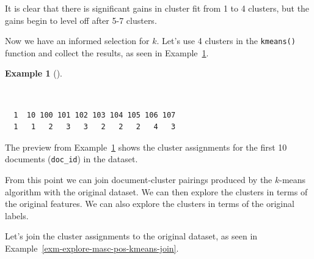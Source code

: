 \documentclass[
  letterpaper,
]{book}
\newenvironment{Shaded}{\begin{snugshade}}{\end{snugshade}}
\newcommand{\AttributeTok}[1]{\textcolor[rgb]{0.00,0.00,0.00}{#1}}
\newcommand{\CommentTok}[1]{\textcolor[rgb]{0.00,0.00,0.00}{\textit{#1}}}
\newcommand{\DecValTok}[1]{\textcolor[rgb]{0.00,0.00,0.00}{#1}}
\newcommand{\FunctionTok}[1]{\textcolor[rgb]{0.00,0.00,0.00}{#1}}
\newcommand{\NormalTok}[1]{\textcolor[rgb]{0.00,0.00,0.00}{#1}}
\newcommand{\OtherTok}[1]{\textcolor[rgb]{0.00,0.00,0.00}{#1}}
\newcommand{\SpecialCharTok}[1]{\textcolor[rgb]{0.00,0.00,0.00}{#1}}
\theoremstyle{definition}
\newtheorem{example}{Example}[chapter]
\theoremstyle{remark}
\begin{document}
It is clear that there is significant gains in cluster fit from 1 to 4
clusters, but the gains begin to level off after 5-7 clusters.

Now we have an informed selection for \(k\). Let's use 4 clusters in the
\texttt{kmeans()} function and collect the results, as seen in
Example~\ref{exm-explore-masc-pos-kmeans-fit}.

\begin{example}[]\protect\hypertarget{exm-explore-masc-pos-kmeans-fit}{}\label{exm-explore-masc-pos-kmeans-fit}

~

\begin{Shaded}
\end{Shaded}

\begin{verbatim}
  1  10 100 101 102 103 104 105 106 107 
  1   1   2   3   3   2   2   2   4   3 
\end{verbatim}

\end{example}

The preview from Example~\ref{exm-explore-masc-pos-kmeans-fit} shows the
cluster assignments for the first 10 documents (\texttt{doc\_id}) in the
dataset.

From this point we can join document-cluster pairings produced by the
\(k\)-means algorithm with the original dataset. We can then explore the
clusters in terms of the original features. We can also explore the
clusters in terms of the original labels.

Let's join the cluster assignments to the original dataset, as seen in
Example~\ref{exm-explore-masc-pos-kmeans-join}.
\end{document}

